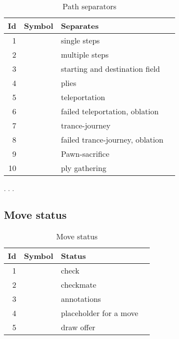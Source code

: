 \begin{table}[!h]
\centering
\begin{tabular}{ rlll }
\toprule
\textbf{Id} & \textbf{Symbol}      & \textbf{Separates}                         \\
\midrule
 1          & \alg{.}              & single steps                               \\
 2          & \alg{..}             & multiple steps                             \\
 3          & \alg{-}              & starting and destination field             \\
 4          & \alg{\~{}}           & plies                                      \\
 5          & \alg{|}              & teleportation                              \\
 6          & \alg{||}             & failed teleportation, oblation             \\
 7          & \alg{@}              & trance-journey                             \\
 8          & \alg{@@}             & failed trance-journey, oblation            \\
 9          & \alg{::}             & Pawn-sacrifice                             \\ \cmidrule{1-3}
10          & \alg{[]}             & ply gathering                              \\
\bottomrule
\end{tabular}
\caption{Path separators}
\label{tbl:Appendix/Path separators}
\end{table}

. . .

\clearpage %

\subsection*{Move status}
\label{sec:Appendix/Move status}

\begin{table}[!h]
\centering
\begin{tabular}{ rlll }
\toprule
\textbf{Id} & \textbf{Symbol}      & \textbf{Status}                \\
\midrule
1           & \alg{+}              & check                          \\
2           & \alg{\#}             & checkmate                      \\ \cmidrule{1-3}
3           & \alg{\_}             & annotations                    \\
4           & \alg{...}            & placeholder for a move         \\
5           & \alg{(=)}            & draw offer                     \\
\bottomrule
\end{tabular}
\caption{Move status}
\label{tbl:Appendix/Move status}
\end{table}

